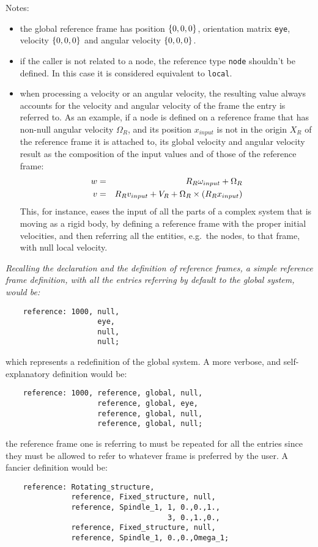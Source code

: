 Notes: 
\begin{itemize}
    \item the global reference frame has position $ \left\{ 0, 0, 0 \right\} $,
    orientation matrix \texttt{eye}, velocity $ \left\{ 0, 0, 0 \right\} $ and angular
    velocity $ \left\{ 0, 0, 0 \right\} $.
    \item if the caller is not related to a node, the reference type
    \texttt{node} shouldn't be defined. 
    In this case it is considered equivalent to \texttt{local}.
    \item when processing a velocity or an angular velocity, the resulting
    value always accounts for the velocity and angular velocity of the frame
    the entry is referred to. 
    As an example, if a node is defined on a reference frame that has
    non-null angular velocity $ \Omega_R $, and its position 
    $ x_{input} $ is not in the origin $ X_R $ of the reference frame
    it is attached to, its global velocity and angular velocity result
    as the composition of the input values and of those of the reference 
    frame:
    \begin{eqnarray*}    
        w & = & R_R\omega_{input}+\Omega_R \\
	v & = & R_Rv_{input}+V_R+\Omega_R\times\left( R_Rx_{input} \right)
    \end{eqnarray*}
    This, for instance, eases the input of all the parts of a complex system
    that is moving as a rigid body, by defining a reference frame with the
    proper initial velocities, and then referring all the entities, e.g.\ the 
    nodes, to that frame, with null local velocity.
\end{itemize}  
{\em
    Recalling the declaration and the definition of reference frames,
    a simple reference frame definition, with all the entries referring 
    by default to the global system, would be:
    \begin{verbatim}
    reference: 1000, null,
                     eye,
                     null,
                     null;			 
    \end{verbatim}
    which represents a redefinition of the global system.
    A more verbose, and self-explanatory definition would be:
    \begin{verbatim}
    reference: 1000, reference, global, null,
                     reference, global, eye,
                     reference, global, null,
                     reference, global, null;			 
    \end{verbatim}
    the reference frame one is referring to must be repeated for all the entries
    since they must be allowed to refer to whatever frame is preferred 
    by the user.
    A fancier definition would be:
    \begin{verbatim}
    reference: Rotating_structure, 
               reference, Fixed_structure, null,
               reference, Spindle_1, 1, 0.,0.,1., 
                                     3, 0.,1.,0.,
               reference, Fixed_structure, null,
               reference, Spindle_1, 0.,0.,Omega_1;
    \end{verbatim}
}


